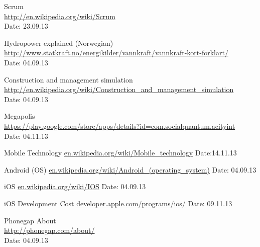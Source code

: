 \begin{thebibliography}{99}
	Scrum \\ 
	\href{http://en.wikipedia.org/wiki/Scrum}{http://en.wikipedia.org/wiki/Scrum} \\
	Date: 23.09.13

	Hydropower explained (Norwegian) \\
	\href {http://www.statkraft.no/energikilder/vannkraft/vannkraft-kort-forklart/}{http://www.statkraft.no/energikilder/vannkraft/vannkraft-kort-forklart/} \\
	Date: 04.09.13


	Construction and management simulation \\
	\href {http://en.wikipedia.org/wiki/Construction_and_management_simulation}{http://en.wikipedia.org/wiki/Construction\_and\_management\_simulation} \\
	Date: 04.09.13

	Megapolis \\
	\href {https://play.google.com/store/apps/details?id=com.socialquantum.acityint}{https://play.google.com/store/apps/details?id=com.socialquantum.acityint} \\
	Date: 04.11.13

	Mobile Technology\newline
	\href{http://en.wikipedia.org/wiki/Mobile_technology}{en.wikipedia.org/wiki/Mobile\_technology}\newline
	Date:14.11.13

	Android (OS)\newline
	\href {http://en.wikipedia.org/wiki/Android\_(operating_system)}{en.wikipedia.org/wiki/Android\_(operating\_system)}\newline
	Date: 04.09.13

	iOS\newline
	\href {http://en.wikipedia.org/wiki/IOS}{en.wikipedia.org/wiki/IOS}\newline
	Date: 04.09.13

	iOS Development Cost\newline
	\href {https://developer.apple.com/programs/ios/}{developer.apple.com/programs/ios/}\newline
	Date: 09.11.13

	Phonegap About \\
	\href{http://phonegap.com/about/}{http://phonegap.com/about/} \\
	Date: 04.09.13


\end{thebibliography}
